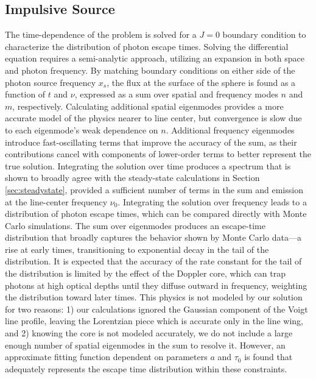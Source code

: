 \documentclass[linenumbers]{aastex63}
\begin{document}
\subsection{Impulsive Source}
The time-dependence of the problem is solved for a $J=0$ boundary condition to characterize the distribution of photon escape times. Solving the differential equation requires a semi-analytic approach, utilizing an expansion in both space and photon frequency. By matching boundary conditions on either side of the photon source frequency $x_s$, the flux at the surface of the sphere is found as a function of $t$ and $\nu$, expressed as a sum over spatial and frequency modes $n$ and $m$, respectively. Calculating additional spatial eigenmodes provides a more accurate model of the physics nearer to line center, but convergence is slow due to each eigenmode's weak dependence on $n$. Additional frequency eigenmodes introduce fast-oscillating terms that improve the accuracy of the sum, as their contributions cancel with components of lower-order terms to better represent the true solution. Integrating the solution over time produces a spectrum that is shown to broadly agree with the steady-state calculations in Section \ref{sec:steadystate}, provided a sufficient number of terms in the sum and emission at the line-center frequency $\nu_0$. Integrating the solution over frequency leads to a distribution of photon escape times, which can be compared directly with Monte Carlo simulations. The sum over eigenmodes produces an escape-time distribution that broadly captures the behavior shown by Monte Carlo data---a rise at early times, transitioning to exponential decay in the tail of the distribution. It is expected that the accuracy of the rate constant for the tail of the distribution is limited by the effect of the Doppler core, which can trap photons at high optical depths until they diffuse outward in frequency, weighting the distribution toward later times. This physics is not modeled by our solution for two reasons: 1) our calculations ignored the Gaussian component of the Voigt line profile, leaving the Lorentzian piece which is accurate only in the line wing, and 2) knowing the core is not modeled accurately, we do not include a large enough number of spatial eigenmodes in the sum to resolve it. However, an approximate fitting function dependent on parameters $a$ and $\tau_0$ is found that adequately represents the escape time distribution within these constraints.
\end{document}
